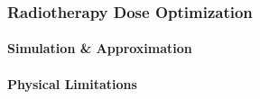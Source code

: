 \subsubsection{Radiotherapy Dose Optimization}

\paragraph{Simulation \& Approximation}

\paragraph{Physical Limitations}

